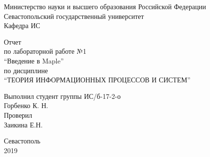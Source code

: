 \documentclass[a4paper,14pt]{extarticle}
\newcommand{\mylabnumber}{1}
\newcommand{\mylabtitle}{Введение в Maple}
\newcommand{\mysubject}{Теория информационных процессов и систем}
\newcommand{\mylecturer}{Заикина Е.Н.}
\begin{document}
    \lstset{ %
        basicstyle=\footnotesize\ttfamily,
        breaklines=true,
        numbersep=5pt,
        tabsize=4,
        gobble=8,
        extendedchars=\true,
        keepspaces=\true,
        numbers=left,
        stringstyle=\ttfamily,
        showstringspaces=\true
    }


    \begin{titlepage}
        
        \thispagestyle{empty}
        
        \begin{center}
            
            Министерство науки и высшего образования Российской Федерации \\
            Севастопольский государственный университет \\
            Кафедра ИС
            
            \vfill

            Отчет \\
            по лабораторной работе №\mylabnumber \\
            \enquote{\mylabtitle} \\
            по дисциплине \\
            \enquote{\MakeTextUppercase{\mysubject}}

        \end{center}

        \vspace{1cm}

        \noindent\hspace{7.5cm} Выполнил студент группы ИС/б-17-2-о \\
        \null\hspace{7.5cm} Горбенко К. Н. \\
        \null\hspace{7.5cm} Проверил \\
        \null\hspace{7.5cm} \mylecturer

        \vfill

        \begin{center}
            Севастополь \\
            2019
        \end{center}

    \end{titlepage}
\end{document}
